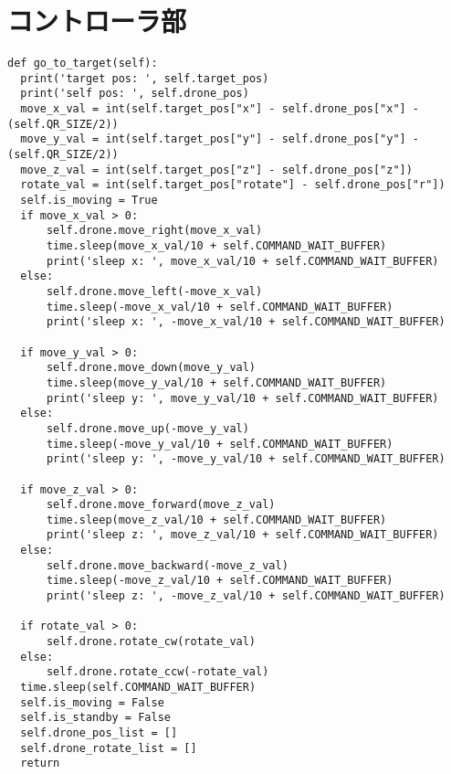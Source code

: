 \section{コントローラ部}
\label{implement_controller}

\begin{lstlisting}[caption=controller.py,label=go_to_target_method]
def go_to_target(self):
  print('target pos: ', self.target_pos)
  print('self pos: ', self.drone_pos) 
  move_x_val = int(self.target_pos["x"] - self.drone_pos["x"] - (self.QR_SIZE/2))
  move_y_val = int(self.target_pos["y"] - self.drone_pos["y"] - (self.QR_SIZE/2))
  move_z_val = int(self.target_pos["z"] - self.drone_pos["z"])
  rotate_val = int(self.target_pos["rotate"] - self.drone_pos["r"])
  self.is_moving = True
  if move_x_val > 0:
      self.drone.move_right(move_x_val)
      time.sleep(move_x_val/10 + self.COMMAND_WAIT_BUFFER)
      print('sleep x: ', move_x_val/10 + self.COMMAND_WAIT_BUFFER)
  else:
      self.drone.move_left(-move_x_val)
      time.sleep(-move_x_val/10 + self.COMMAND_WAIT_BUFFER)
      print('sleep x: ', -move_x_val/10 + self.COMMAND_WAIT_BUFFER)

  if move_y_val > 0:
      self.drone.move_down(move_y_val)
      time.sleep(move_y_val/10 + self.COMMAND_WAIT_BUFFER)
      print('sleep y: ', move_y_val/10 + self.COMMAND_WAIT_BUFFER)
  else:
      self.drone.move_up(-move_y_val)
      time.sleep(-move_y_val/10 + self.COMMAND_WAIT_BUFFER)
      print('sleep y: ', -move_y_val/10 + self.COMMAND_WAIT_BUFFER)

  if move_z_val > 0:
      self.drone.move_forward(move_z_val)
      time.sleep(move_z_val/10 + self.COMMAND_WAIT_BUFFER)
      print('sleep z: ', move_z_val/10 + self.COMMAND_WAIT_BUFFER)
  else:
      self.drone.move_backward(-move_z_val)
      time.sleep(-move_z_val/10 + self.COMMAND_WAIT_BUFFER)
      print('sleep z: ', -move_z_val/10 + self.COMMAND_WAIT_BUFFER)

  if rotate_val > 0:
      self.drone.rotate_cw(rotate_val)
  else:
      self.drone.rotate_ccw(-rotate_val)
  time.sleep(self.COMMAND_WAIT_BUFFER)
  self.is_moving = False
  self.is_standby = False
  self.drone_pos_list = []
  self.drone_rotate_list = []
  return
\end{lstlisting}
